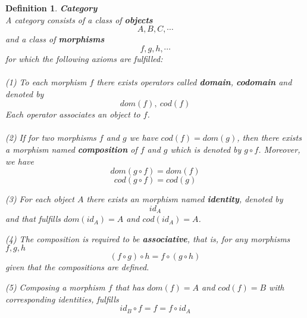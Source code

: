 \documentclass[17pt]{extarticle}
\newtheorem*{definition*}{Definition}
\begin{document}
	\begin{definition*}
		\textbf{Category}\\
A category consists of a class of \textbf{objects} 
$$
A, B, C, \cdots
$$
 and a class of \textbf{morphisms}
 $$f, g, h, \cdots$$
for which the following axioms are fulfilled:\\ \\
(1) To each morphism $f$ there exists operators called \textbf{domain}, \textbf{codomain}
and denoted by
$$ dom(f), \ cod(f)$$
Each operator associates an object to $f$.\\ \\

(2) If for two morphisms $f$ and $g$ we have $cod(f)=dom(g)$, then there exists a morphism
named \textbf{composition} of $f$ and $g$ which is denoted by $g\circ f$.
Moreover, we have 
$$dom(g\circ f)=dom(f)$$
$$ cod(g\circ f)=cod(g)$$

(3) For each object $A$ there exists an morphism named \textbf{identity}, denoted by
$$id_A$$ and that fulfills $dom(id_A)=A$ and $cod(id_A)=A$.

(4) The composition is required to be \textbf{associative}, that is, for any morphisms $f,g,h$ 
$$(f\circ g)\circ h=f\circ(g\circ h)$$
given that the compositions are defined.

(5) Composing a morphism $f$ that has $dom(f)=A$ and $cod(f)=B$ with corresponding identities, fulfills
$$id_B\circ f=f=f\circ id_A$$
\end{definition*}
\end{document}
